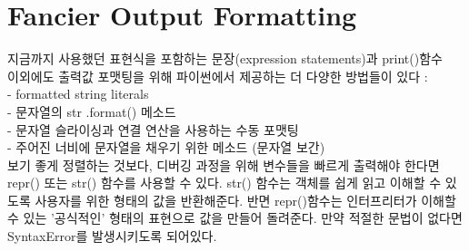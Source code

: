 \vspace{-1cm}
\section{Fancier Output Formatting}

지금까지 사용했던 표현식을 포함하는 문장(expression statements)과 print()함수 \\이외에도 출력값 포맷팅을 위해 파이썬에서 제공하는 더 다양한 방법들이 있다 :\\
- formatted string literals\\
- 문자열의 str .format() 메소드\\
- 문자열 슬라이싱과 연결 연산을 사용하는 수동 포맷팅\\
- 주어진 너비에 문자열을 채우기 위한 메소드 (문자열 보간)\\

보기 좋게 정렬하는 것보다, 디버깅 과정을 위해 변수들을 빠르게 출력해야 한다면 repr() 또는 str() 함수를 사용할 수 있다.
str() 함수는 객체를 쉽게 읽고 이해할 수 있도록 사용자를 위한 형태의 값을 반환해준다.
반면 repr()함수는 인터프리터가 이해할 수 있는 '공식적인' 형태의 표현으로 값을 만들어 돌려준다. 만약 적절한 문법이 없다면 SyntaxError를 발생시키도록 되어있다.

